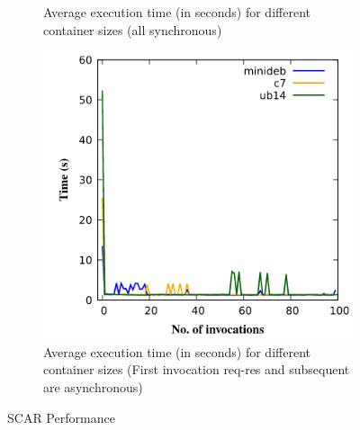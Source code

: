 \begin{figure}[!b]
\begin{subfigure}{0.33\textwidth}
  \caption{Average execution time (in seconds) for different container sizes (all synchronous) \cite{PEREZ201850}}
  \label{fig:scar3}
\end{subfigure} \hfil%
\begin{subfigure}{0.33\textwidth}
  \includegraphics[width=\linewidth]{images/scar-4.png}
  \caption{Average execution time (in seconds) for different container sizes (First invocation req-res and subsequent are asynchronous) \cite{PEREZ201850}}
  \label{fig:scar4}
\end{subfigure} \hfil%
\caption{SCAR Performance}
\label{fig:scar_performance}
\end{figure}


